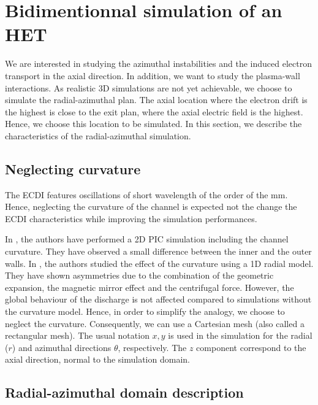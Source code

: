 
\section{Bidimentionnal simulation of an \ac{HET}}

We are interested in studying the azimuthal instabilities and the induced electron transport in the axial direction.
In addition, we want to study the plasma-wall interactions.
As realistic \ac{3D} simulations are not yet achievable, we choose to simulate the radial-azimuthal plan.
The axial location where the electron drift is the highest is close to the exit plan, where the axial electric field is the highest.
Hence, we choose this location to be simulated.
In this section, we describe the characteristics of the radial-azimuthal simulation.


\subsection{Neglecting curvature}
The \ac{ECDI} features oscillations of short wavelength of the order of the mm.
Hence, neglecting the curvature of the channel is expected not the change the \ac{ECDI} characteristics while improving the simulation performances.

In  \citet{heron2013},  the authors have performed a \ac{2D} \ac{PIC} simulation including the channel curvature.
They have observed a small difference between the inner and the outer walls.
In  \citet{dominguez-vazquez2018}, the authors studied the effect of the curvature using a \ac{1D} radial model.
They have shown asymmetries due to the combination of the geometric expansion, the magnetic mirror effect and the centrifugal force.
However, the global behaviour of the discharge is not affected compared to simulations without the curvature model.
Hence, in order to simplify the analogy, we choose to neglect the curvature.
Consequently, we can use a Cartesian mesh (also called a rectangular mesh).
The usual notation $x,y$ is used in the simulation for the radial ($r$) and azimuthal directions $\theta$, respectively.
The $z$ component correspond to the axial direction, normal to the simulation domain.

\subsection{Radial-azimuthal domain description}

